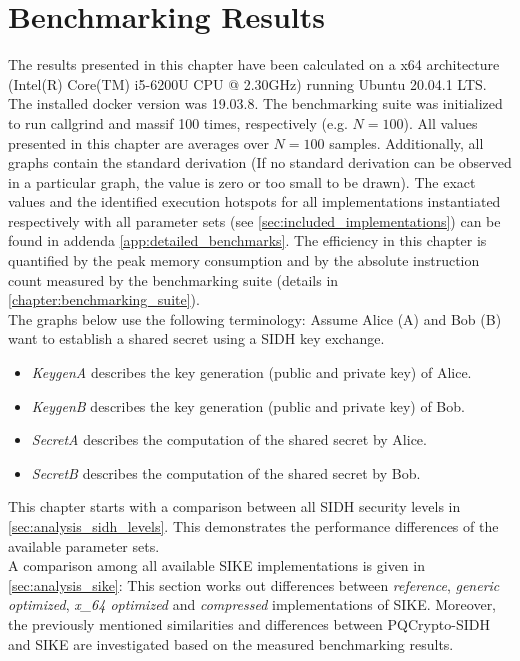 \chapter{Benchmarking Results}\label{chapter:analysis}

The results presented in this chapter have been calculated on a x64 architecture (Intel(R) Core(TM) i5-6200U CPU @ 2.30GHz) running Ubuntu 20.04.1 LTS. The installed docker version was 19.03.8. The benchmarking suite was initialized to run callgrind and massif 100 times, respectively (e.g. $N=100$). All values presented in this chapter are averages over $N=100$ samples. Additionally, all graphs contain the standard derivation (If no standard derivation can be observed in a particular graph, the value is zero or too small to be drawn). The exact values and the identified execution hotspots for all implementations instantiated respectively with all parameter sets (see \autoref{sec:included_implementations}) can be found in addenda \ref{app:detailed_benchmarks}. The efficiency in this chapter is quantified by the peak memory consumption and by the absolute instruction count measured by the benchmarking suite (details in \autoref{chapter:benchmarking_suite}). \\
The graphs below use the following terminology:
Assume Alice (A) and Bob (B) want to establish a shared secret using a \gls{SIDH} key exchange.
\begin{itemize}
\item \textit{KeygenA} describes the key generation (public and private key) of Alice.
\item \textit{KeygenB} describes the key generation (public and private key) of Bob.
\item \textit{SecretA} describes the computation of the shared secret by Alice.
\item \textit{SecretB} describes the computation of the shared secret by Bob.
\end{itemize}
This chapter starts with a comparison between all \gls{SIDH} security levels in \autoref{sec:analysis_sidh_levels}. This demonstrates the performance differences of the available parameter sets. \\
A comparison among all available \gls{SIKE} implementations is given in \autoref{sec:analysis_sike}: This section  works out differences between \textit{reference}, \textit{generic optimized}, \textit{x\_64 optimized} and \textit{compressed} implementations of SIKE. Moreover, the previously mentioned similarities and differences between \gls{PQCrypto-SIDH} and \gls{SIKE} are investigated based on the measured benchmarking results. \\
